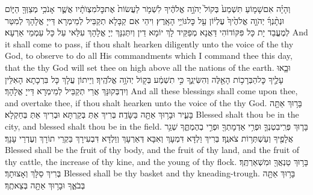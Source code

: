 \newperek
\newseder
{}%
{וְהָיָ֗ה אִם\maqqaf שָׁמ֤וֹעַ תִּשְׁמַע֙ בְּקוֹל֙ יְהֹוָ֣ה אֱלֹהֶ֔יךָ לִשְׁמֹ֤ר לַעֲשׂוֹת֙ אֶת\maqqaf כׇּל\maqqaf מִצְוֺתָ֔יו אֲשֶׁ֛ר אָנֹכִ֥י מְצַוְּךָ֖ הַיּ֑וֹם וּנְתָ֨נְךָ֜ יְהֹוָ֤ה אֱלֹהֶ֙יךָ֙ עֶלְי֔וֹן עַ֖ל כׇּל\maqqaf גּוֹיֵ֥י הָאָֽרֶץ׃}
{וִיהֵי אִם קַבָּלָא תְקַבֵּיל לְמֵימְרָא דַּייָ אֱלָהָךְ לְמִטַּר לְמֶעֱבַד יָת כָּל פִּקּוֹדוֹהִי דַּאֲנָא מְפַקֵּיד לָךְ יוֹמָא דֵין וְיִתְּנִנָּךְ יְיָ אֱלָהָךְ עִלַּאי עַל כָּל עַמְמֵי אַרְעָא׃}
{And it shall come to pass, if thou shalt hearken diligently unto the voice of the \lord\space thy God, to observe to do all His commandments which I command thee this day, that the \lord\space thy God will set thee on high above all the nations of the earth.}{}
{וּבָ֧אוּ עָלֶ֛יךָ כׇּל\maqqaf הַבְּרָכ֥וֹת הָאֵ֖לֶּה וְהִשִּׂיגֻ֑ךָ כִּ֣י תִשְׁמַ֔ע בְּק֖וֹל יְהֹוָ֥ה אֱלֹהֶֽיךָ׃}
{וְיֵיתוֹן עֲלָךְ כָּל בִּרְכָתָא הָאִלֵּין וְיִדְבְּקוּנָּךְ אֲרֵי תְקַבֵּיל לְמֵימְרָא דַּייָ אֱלָהָךְ׃}
{And all these blessings shall come upon thee, and overtake thee, if thou shalt hearken unto the voice of the \lord\space thy God.}{}
{בָּר֥וּךְ אַתָּ֖ה בָּעִ֑יר וּבָר֥וּךְ אַתָּ֖ה בַּשָּׂדֶֽה׃}
{בְּרִיךְ אַתְּ בְּקַרְתָּא וּבְרִיךְ אַתְּ בְּחַקְלָא׃}
{Blessed shalt thou be in the city, and blessed shalt thou be in the field.}{}
{בָּר֧וּךְ פְּרִֽי\maqqaf בִטְנְךָ֛ וּפְרִ֥י אַדְמָתְךָ֖ וּפְרִ֣י בְהֶמְתֶּ֑ךָ שְׁגַ֥ר אֲלָפֶ֖יךָ וְעַשְׁתְּר֥וֹת צֹאנֶֽךָ׃}
{בְּרִיךְ וַלְדָּא דִּמְעָךְ וְאִבָּא דְּאַרְעָךְ וְוַלְדָּא דִּבְעִירָךְ בַּקְרֵי תוֹרָךְ וְעֶדְרֵי עָנָךְ׃}
{Blessed shall be the fruit of thy body, and the fruit of thy land, and the fruit of thy cattle, the increase of thy kine, and the young of thy flock.}{}
{בָּר֥וּךְ טַנְאֲךָ֖ וּמִשְׁאַרְתֶּֽךָ׃}
{בְּרִיךְ סַלָּךְ וְאָצוּתָךְ׃}
{Blessed shall be thy basket and thy kneading-trough.}{}
{בָּר֥וּךְ אַתָּ֖ה בְּבֹאֶ֑ךָ וּבָר֥וּךְ אַתָּ֖ה בְּצֵאתֶֽךָ׃}
